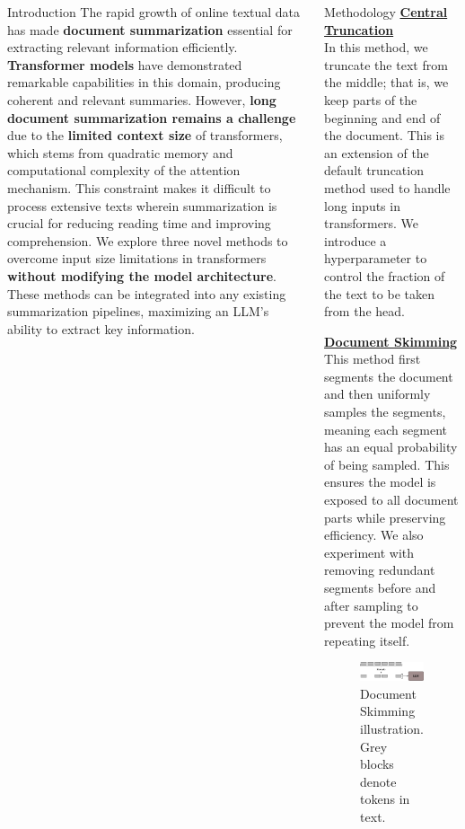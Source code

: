 \documentclass[20pt]{beamer}
\newcommand{\heading}[1]{\ul{\textbf{#1}} \\}
\begin{document}
\begin{frame}[t]
\begin{columns}[t]
  \begin{block}{Introduction}
    The rapid growth of online textual data has made \textbf{document summarization} essential for extracting relevant information efficiently.
    \textbf{Transformer models} have demonstrated remarkable capabilities in this domain, producing coherent and relevant summaries.
    However, \textbf{long document summarization remains a challenge} due to the \textbf{limited context size} of transformers, which stems from quadratic memory and computational complexity of the attention mechanism.
    This constraint makes it difficult to process extensive texts wherein summarization is crucial for reducing reading time and improving comprehension.
    We explore three novel methods to overcome input size limitations in transformers \textbf{without modifying the model architecture}.
    These methods can be integrated into any existing summarization pipelines, maximizing an LLM’s ability to extract key information.
  \end{block}

  \begin{block}{Methodology}
    \heading{Central Truncation}
    In this method, we truncate the text from the middle; that is, we keep parts of the beginning and end of the document.
    This is an extension of the default truncation method used to handle long inputs in transformers.
    We introduce a hyperparameter to control the fraction of the text to be taken from the head.

    \heading{Document Skimming}
    This method first segments the document and then uniformly samples the segments, meaning each segment has an equal probability of being sampled.
    This ensures the model is exposed to all document parts while preserving efficiency.
    We also experiment with removing redundant segments before and after sampling to prevent the model from repeating itself.
    \begin{figure}[!h]
      \centering
      \includegraphics[width=\textwidth]{images/doc-skim.png}
      \caption{Document Skimming illustration. Grey blocks denote tokens in text.}
    \end{figure}
  \end{block}



\end{columns}
\end{frame}
\end{document}
